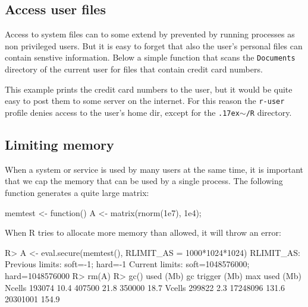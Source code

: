 \documentclass[article]{jss}
\newcommand{\R}{\textsf{R}\xspace}
\begin{document}
\begin{appendices}
\subsection{Access user files}
\label{creditcard}

Access to system files can to some extend by prevented by running processes as
non privileged users. But it is easy to forget that also the user's personal
files can contain senstive information. Below a simple function that scans the
\texttt{Documents} directory of the current user for files that contain credit
card numbers.

\begin{CodeChunk}
\end{CodeChunk}

This example prints the credit card numbers to the user, but it would be quite
easy to post them to some server on the internet. For this reason the
\texttt{r-user} profile denies access to the user's home dir, except for the
\texttt{{\raise.17ex\hbox{$\scriptstyle\sim$}}/R} directory.


\subsection{Limiting memory}

When a system or service is used by many users at the same time, it is important
that we cap the memory that can be used by a single process. The following
function generates a quite large matrix:

\begin{CodeChunk}
\begin{CodeInput}
memtest <- function(){
	A <- matrix(rnorm(1e7), 1e4);
}
\end{CodeInput}
\end{CodeChunk}

When \R tries to allocate more memory than allowed, it will throw an error:

\begin{CodeChunk}
\begin{CodeInput}
R> A <- eval.secure(memtest(), RLIMIT_AS = 1000*1024*1024)
RLIMIT_AS:
Previous limits: soft=-1; hard=-1
Current limits: soft=1048576000; hard=1048576000
R> rm(A)
R> gc()
         used (Mb) gc trigger  (Mb) max used  (Mb)
Ncells 193074 10.4     407500  21.8   350000  18.7
Vcells 299822  2.3   17248096 131.6 20301001 154.9



\end{CodeInput}
\end{CodeChunk}
\end{appendices}
\end{document}
